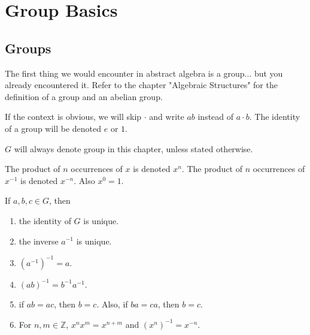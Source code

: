 

    \section{Group Basics}
    
    \subsection{Groups}
    
    The first thing we would encounter in abstract algebra is a group... but you already encountered it. Refer to the chapter "Algebraic Structures" for the definition of a group and an abelian group.
    
    If the context is obvious, we will skip $\cdot$ and write $ab$ instead of $a \cdot b$. The identity of a group will be denoted $e$ or $1$.
    
    $G$ will always denote group in this chapter, unless stated otherwise.
    
    \begin{defn} \label{def_group_power}
        The product of $n$ occurrences of $x$ is denoted $x^n$. The product of $n$ occurrences of $x^{-1}$ is denoted $x^{-n}$. Also $x^0 = 1$.
    \end{defn}
    
    \begin{prop} \label{prop_group_basics}
        If $a,b,c \in G$, then \begin{enumerate}
            \item the identity of $G$ is unique.
            \item the inverse $a^{-1}$ is unique.
            \item $(a^{-1})^{-1}=a$.
            \item $(ab)^{-1} = b^{-1}a^{-1}$.
            \item if $ab=ac$, then $b=c$. Also, if $ba=ca$, then $b=c$.
            \item For $n,m \in \mathbb{Z}$, $x^nx^m = x^{n+m}$ and $(x^n)^{-1} = x^{-n}.$
        \end{enumerate}
    \end{prop}
    
